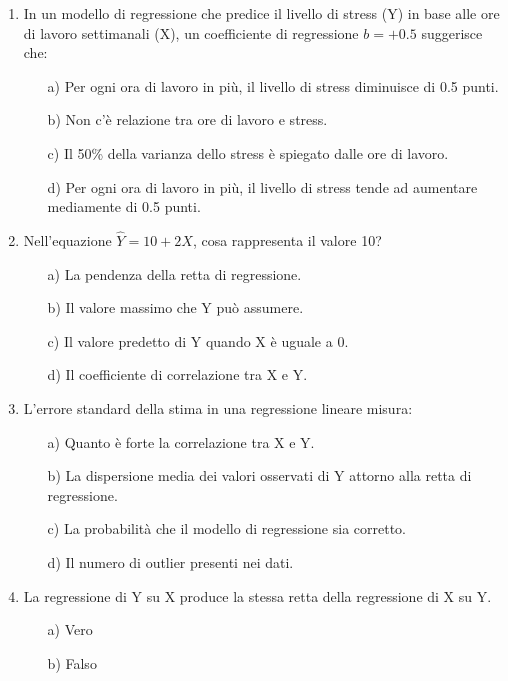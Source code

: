 \documentclass[12pt, a4paper]{article}
\newcommand{\bcoeff}{b}
\newcommand{\Yhat}{\hat{Y}}
\begin{document}
\begin{enumerate}
\item  In un modello di regressione che predice il livello di stress (Y) in base alle ore di lavoro settimanali (X), un coefficiente di regressione $\bcoeff = +0.5$ suggerisce che:
\begin{itemize}
    \item[a)] Per ogni ora di lavoro in più, il livello di stress diminuisce di 0.5 punti.
    \item[b)] Non c'è relazione tra ore di lavoro e stress.
    \item[c)] Il 50\% della varianza dello stress è spiegato dalle ore di lavoro.
    \item[d)] Per ogni ora di lavoro in più, il livello di stress tende ad aumentare mediamente di 0.5 punti.
\end{itemize}
\vspace{0.3cm}

\item  Nell'equazione $\Yhat = 10 + 2X$, cosa rappresenta il valore 10?
\begin{itemize}
    \item[a)] La pendenza della retta di regressione.
    \item[b)] Il valore massimo che Y può assumere.
    \item[c)] Il valore predetto di Y quando X è uguale a 0.
    \item[d)] Il coefficiente di correlazione tra X e Y.
\end{itemize}
\vspace{0.3cm}

\item  L'errore standard della stima in una regressione lineare misura:
\begin{itemize}
    \item[a)] Quanto è forte la correlazione tra X e Y.
    \item[b)] La dispersione media dei valori osservati di Y attorno alla retta di regressione.
    \item[c)] La probabilità che il modello di regressione sia corretto.
    \item[d)] Il numero di outlier presenti nei dati.
\end{itemize}
\vspace{0.3cm}

\item  La regressione di Y su X produce la stessa retta della regressione di X su Y.
 \begin{itemize}
    \item[a)] Vero
    \item[b)] Falso
\end{itemize}
\vspace{0.3cm}


\end{enumerate}
\end{document}
